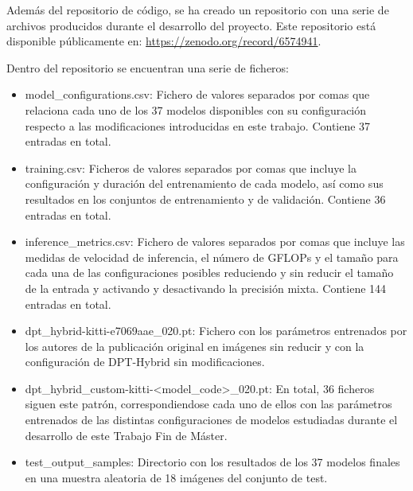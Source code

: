 
Además del repositorio de código, se ha creado un repositorio con una serie de archivos producidos durante el desarrollo del proyecto. Este repositorio está disponible públicamente en: \url{https://zenodo.org/record/6574941}.

Dentro del repositorio se encuentran una serie de ficheros:

\begin{itemize}
\item model{\_}configurations.csv: Fichero de valores separados por comas que relaciona cada uno de los 37 modelos disponibles con su configuración respecto a las modificaciones introducidas en este trabajo. Contiene 37 entradas en total.
\item training.csv: Ficheros de valores separados por comas que incluye la configuración y duración del entrenamiento de cada modelo, así como sus resultados en los conjuntos de entrenamiento y de validación. Contiene 36 entradas en total.
\item inference{\_}metrics.csv: Fichero de valores separados por comas que incluye las medidas de velocidad de inferencia, el número de GFLOPs y el tamaño para cada una de las configuraciones posibles reduciendo y sin reducir el tamaño de la entrada y activando y desactivando la precisión mixta. Contiene 144 entradas en total.
\item dpt{\_}hybrid-kitti-e7069aae{\_}020.pt: Fichero con los parámetros entrenados por los autores de la publicación original en imágenes sin reducir y con la configuración de DPT-Hybrid sin modificaciones.
\item dpt{\_}hybrid{\_}custom-kitti-<model{\_}code>{\_}020.pt: En total, 36 ficheros siguen este patrón, correspondiendose cada uno de ellos con las parámetros entrenados de las distintas configuraciones de modelos estudiadas durante el desarrollo de este Trabajo Fin de Máster.
\item test{\_}output{\_}samples: Directorio con los resultados de los 37 modelos finales en una muestra aleatoria de 18 imágenes del conjunto de test.
\end{itemize}